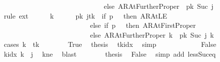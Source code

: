 \begin{isabellebody}
\ \ \ \ \ \ \ \ \ \ \ \ \ \ \ \ \ \ \ \ \ \ \ \ \ \ \ \ \ \ else\ AR{\isacharunderscore}{\kern0pt}AtFurtherProper{\isacharparenright}{\kern0pt}\ {\isacharequal}{\kern0pt}\ {\isacharquery}{\kern0pt}pk\ {\isacharparenleft}{\kern0pt}Suc\ j{\isacharparenright}{\kern0pt}{\isachardoublequoteclose}\isanewline
\ \ \isamarkupfalse%
\ {\isacharparenleft}{\kern0pt}rule\ ext{\isacharparenright}{\kern0pt}\isanewline
\ \ \ \ \isamarkupfalse%
\ k\isanewline
\ \ \ \ \isamarkupfalse%
\ {\isachardoublequoteopen}{\isacharparenleft}{\kern0pt}{\isacharparenleft}{\kern0pt}{\isacharquery}{\kern0pt}pk\ j{\isacharparenright}{\kern0pt}{\isacharparenleft}{\kern0pt}{\isacharquery}{\kern0pt}tk\ {\isacharcolon}{\kern0pt}{\isacharequal}{\kern0pt}\ if\ {\isacharquery}{\kern0pt}p\ {\isacharequal}{\kern0pt}\ {}\ then\ AR{\isacharunderscore}{\kern0pt}AtLE\isanewline
\ \ \ \ \ \ \ \ \ \ \ \ \ \ \ \ \ \ \ \ \ \ \ \ \ \ else\ if\ {\isacharquery}{\kern0pt}p\ {\isacharequal}{\kern0pt}\ {}\ then\ AR{\isacharunderscore}{\kern0pt}AtFirstProper\isanewline
\ \ \ \ \ \ \ \ \ \ \ \ \ \ \ \ \ \ \ \ \ \ \ \ \ \ else\ AR{\isacharunderscore}{\kern0pt}AtFurtherProper{\isacharparenright}{\kern0pt}{\isacharparenright}{\kern0pt}\ k\ {\isacharequal}{\kern0pt}\ {\isacharquery}{\kern0pt}pk\ {\isacharparenleft}{\kern0pt}Suc\ j{\isacharparenright}{\kern0pt}\ k{\isachardoublequoteclose}\isanewline
\ \ \ \ \isamarkupfalse%
\ {\isacharparenleft}{\kern0pt}cases\ {\isachardoublequoteopen}k\ {\isacharequal}{\kern0pt}\ {\isacharquery}{\kern0pt}tk{\isachardoublequoteclose}{\isacharparenright}{\kern0pt}\isanewline
\ \ \ \ \ \ \isamarkupfalse%
\ True\ \isamarkupfalse%
\ {\isacharquery}{\kern0pt}thesis\ \isamarkupfalse%
\ tkidx\ \isamarkupfalse%
\ simp\isanewline
\ \ \ \ \isamarkupfalse%
\isanewline
\ \ \ \ \ \ \isamarkupfalse%
\ False\isanewline
\ \ \ \ \ \ \isamarkupfalse%
\ {\isachardoublequoteopen}k{\isacharunderscore}{\kern0pt}idx\ k\ {\isasymnoteq}\ j{\isachardoublequoteclose}\ \isamarkupfalse%
\ kne\ \isamarkupfalse%
\ blast\isanewline
\ \ \ \ \ \ \isamarkupfalse%
\ {\isacharquery}{\kern0pt}thesis\ \isamarkupfalse%
\ False\ \isamarkupfalse%
\ {\isacharparenleft}{\kern0pt}simp\ add{\isacharcolon}{\kern0pt}\ less{\isacharunderscore}{\kern0pt}Suc{\isacharunderscore}{\kern0pt}eq{\isacharparenright}{\kern0pt}\isanewline

\end{isabellebody}
